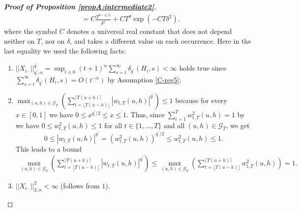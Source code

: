 \documentclass[a4paper,12pt]{article}
\makeatletter
\renewcommand{\eqref}[1]{\tagform@{\ref{#1}}}
\makeatother
\begin{document}
\begin{proof}[\textnormal{\textbf{Proof of Proposition \ref{propA:intermediate2}}}]
\begin{align*}
&= C \frac{ T^{\theta - q^\prime/2}}{\delta^{q^\prime}} + C T^\theta \exp \left(-C T \delta^2\right).
\end{align*}
where the symbol $C$ denotes a universal real constant that does not depend neither on $T$, nor on $\delta$, and takes a different value on each occurrence. Here in the last equality we used the following facts:
\begin{enumerate}
	\item $||X_{i\cdot}||^{q^\prime}_{q^\prime, \alpha} = \sup_{t\geq 0} (t+1)^{\alpha} \sum_{s=t}^{\infty} \delta_{q^\prime}(H_{i}, s)  < \infty$ holds true since $\sum_{s=t}^{\infty}\delta_{q^\prime}(H_{i}, s) = O(t^{-\alpha})$ by Assumption \ref{C-reg5};
	\item $\max_{(u, h) \in \mathcal{G}_T} \left( \sum_{t=\lfloor T(u-h) \rfloor}^{\lceil T(u+h) \rceil} |w_{t,T}(u,h)|^{q^\prime}\right) \leq 1$ because for every $x \in [0, 1]$ we have $ 0 \leq x^{q^\prime/2} \leq x \leq 1$. Thus, since $\sum_{t=1}^{T} w^2_{t,T}(u,h) = 1$ by \eqref{eq:sum_weights} we have \linebreak $0 \leq w^2_{t,T}(u,h) \leq 1$ for all $t\in \{1, \ldots, T\}$ and all $(u, h) \in \mathcal{G}_T$, we get
$$ 0 \leq |w_{t,T}(u,h)|^{q^\prime} =  (w^2_{t,T}(u,h))^{q^\prime/2} \leq w^2_{t,T}(u,h) \leq 1.$$
This leads to a bound  
\begin{align*}
\max_{(u, h) \in \mathcal{G}_T} \left( \sum_{t=\lfloor T(u-h) \rfloor}^{\lceil T(u+h) \rceil} |w_{t,T}(u,h)|^{q^\prime}\right) \leq
\max_{(u, h) \in \mathcal{G}_T} \left( \sum_{t=\lfloor T(u-h) \rfloor}^{\lceil T(u+h) \rceil} w_{t,T}^2(u,h)\right) =1.
\end{align*}
	\item $||X_{i\cdot}||^{2}_{2, \alpha} < \infty$ (follows from $1$).
\end{enumerate}



\end{proof}
\end{document}
